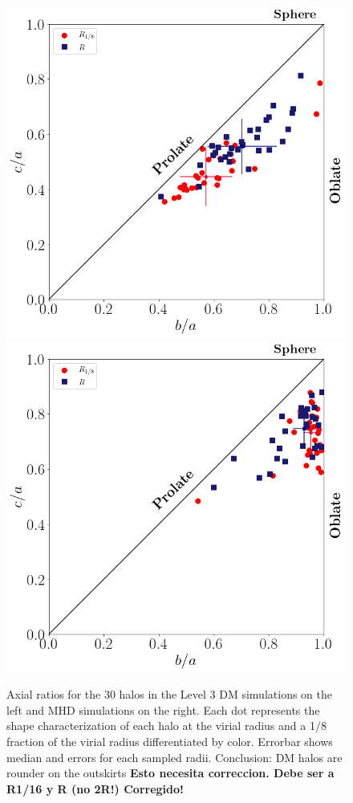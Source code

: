 \documentclass[a4paper,fleqn,usenatbib]{mnras}
\begin{document}
 
\begin{figure}
\begin{center}
\includegraphics[width=0.9\columnwidth]{./pics/Triaxial_Plane/Lvl_4_Triax_Plane_DM.png}
 \includegraphics[width=0.9\columnwidth]{./pics/Triaxial_Plane/Lvl_4_Triax_Plane_MHD.png}
\end{center}
\caption{Axial ratios for the 30 halos in the Level 3 DM simulations
  on the left and MHD simulations on the right.
   Each dot represents the shape characterization of each halo at the virial radius and a  1/8 fraction of the virial radius
   differentiated by color. 
   Errorbar shows median and errors for each sampled radii. 
   Conclusion: DM halos are rounder on the outskirts {\bf Esto necesita
  correccion. Debe ser a R1/16 y R (no 2R!) Corregido!}}
  \label{fig:triax_DM_MHD}
\end{figure}
\end{document}
